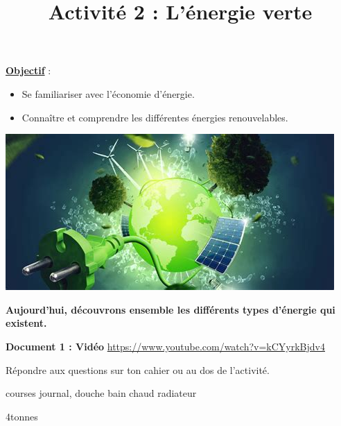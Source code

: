 \documentclass[10pt]{article}
\newcommand{\titreActivite}{Activité 2 : L'énergie verte} %
\newcommand{\objectif}{ 	
	
	\begin{itemize}
		\item Se familiariser avec l'économie d'énergie.
		\item Connaître et comprendre les différentes énergies renouvelables.
	\end{itemize}
} %
\newcommand{\resumeContexte}{Aujourd'hui, découvrons ensemble les différents types d'énergie qui existent.} %
\begin{document}
\date{}
\title{\titreActivite}
\maketitle %


\underline{\textbf{Objectif}} :  \vspace{2pt}
\objectif


\begin{center}
	\includegraphics[width=0.15\columnwidth]{activité.jpg} %
\end{center}

\textbf{\resumeContexte}
\vspace{-12pt}



\textbf{\color{DarkBlue} {Document 1 : Vidéo}} \url{
	https://www.youtube.com/watch?v=kCYyrkBjdv4
}

Répondre aux questions sur ton cahier ou au dos de l'activité.

\begin{question}
\end{question}

	courses journal, douche bain chaud radiateur

    \begin{question}
\end{question}

4tonnes

\begin{question}
\end{question}
\end{document}
